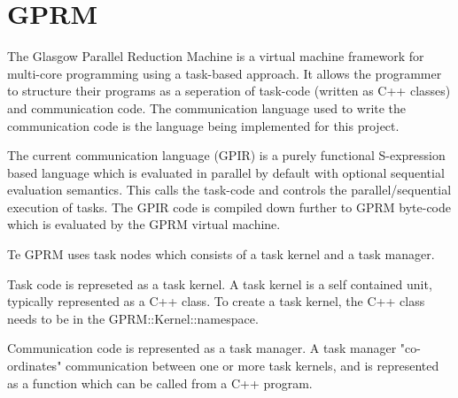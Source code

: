 \section{GPRM}

The Glasgow Parallel Reduction Machine is a virtual machine framework for multi-core programming using a task-based approach. It allows the programmer to structure their programs as a seperation of task-code (written as C++ classes) and communication code. The communication language used to write the communication code is the language being implemented for this project.

The current communication language (GPIR) is a purely functional S-expression based language which is evaluated in parallel by default with optional sequential
evaluation semantics. This calls the task-code and controls the parallel/sequential execution of tasks. The GPIR code is compiled down further
to GPRM byte-code which is evaluated by the GPRM virtual machine.

Te GPRM uses task nodes which consists of a task kernel and a task manager.

Task code is represeted as a task kernel. A task kernel is a self contained unit, typically represented as a C++ class.
To create a task kernel, the C++ class needs to be in the GPRM::Kernel::namespace.

Communication code is represented as a task manager. A task manager "co-ordinates" communication between one or more task kernels, and
is represented as a function which can be called from a C++ program.\cite{GPRM}



